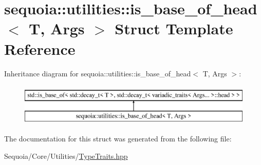 \hypertarget{structsequoia_1_1utilities_1_1is__base__of__head}{}\section{sequoia\+::utilities\+::is\+\_\+base\+\_\+of\+\_\+head$<$ T, Args $>$ Struct Template Reference}
\label{structsequoia_1_1utilities_1_1is__base__of__head}
Inheritance diagram for sequoia\+::utilities\+::is\+\_\+base\+\_\+of\+\_\+head$<$ T, Args $>$\+:\begin{figure}[H]
\begin{center}
\leavevmode
\includegraphics[height=2.000000cm]{structsequoia_1_1utilities_1_1is__base__of__head}
\end{center}
\end{figure}


The documentation for this struct was generated from the following file\+:\begin{DoxyCompactItemize}
\item 
Sequoia/\+Core/\+Utilities/\mbox{\hyperlink{_type_traits_8hpp}{Type\+Traits.\+hpp}}\end{DoxyCompactItemize}
